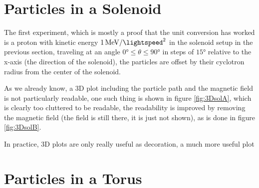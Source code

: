 \documentclass[a4paper,12pt,article]{memoir}
\begin{document}
\section{Particles in a Solenoid}
The first experiment, which is mostly a proof that the unit conversion has worked is a proton with kinetic energy $\SI{1}{\mega\electronvolt\per\square\lightspeed}$ in the solenoid setup in the previous section, traveling at an angle $ \ang{0} \leq\theta\leq \ang{90}$ in steps of $\ang{15}$ relative to the x-axis (the direction of the solenoid), the particles are offset by their cyclotron radius from the center of the solenoid.

As we already know, a 3D plot including the particle path and the magnetic field is not particularly readable, one such thing is shown in figure \ref{fig:3DsolA}, which is clearly too cluttered to be readable, the readability is improved by removing the magnetic field (the field is still there, it is just not shown), as is done in figure \ref{fig:3DsolB}.

In practice, 3D plots are only really useful as decoration, a much more useful plot

\section{Particles in a Torus}

\end{document}
